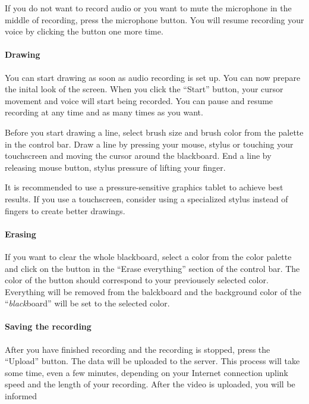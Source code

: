If you do not want to record audio or you want to mute the microphone in the middle of recording, press the microphone button. You will resume recording your voice by clicking the button one more time.

\paragraph{Drawing}
You can start drawing as soon as audio recording is set up. You can now prepare the inital look of the screen. When you click the ``Start'' button, your cursor movement and voice will start being recorded. You can pause and resume recording at any time and as many times as you want.

Before you start drawing a line, select brush size and brush color from the palette in the control bar. Draw a line by pressing your mouse, stylus or touching your touchscreen and moving the cursor around the blackboard. End a line by releasing mouse button, stylus pressure of lifting your finger.

It is recommended to use a pressure-sensitive graphics tablet to achieve best results. If you use a touchscreen, consider using a specialized stylus instead of fingers to create better drawings.

\paragraph{Erasing}
If you want to clear the whole blackboard, select a color from the color palette and click on the button in the ``Erase everything'' section of the control bar. The color of the button should correspond to your previousely selected color. Everything will be removed from the balckboard and the background color of the ``\textit{black}board'' will be set to the selected color.

\paragraph{Saving the recording}
After you have finished recording and the recording is stopped, press the ``Upload'' button. The data will be uploaded to the server. This process will take some time, even a few minutes, depending on your Internet connection uplink speed and the length of your recording. After the video is uploaded, you will be informed
